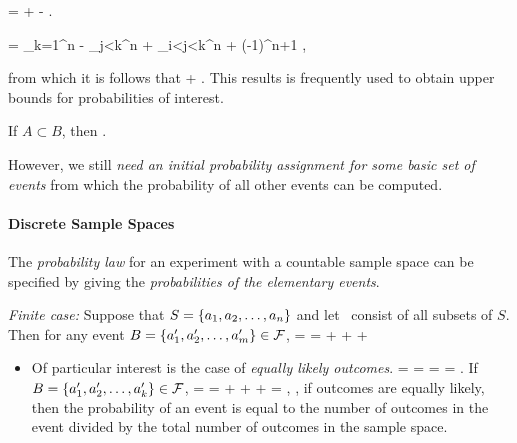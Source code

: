\begin{coro}
	\beq
		 =  +  - .
	\eeq
\end{coro}

\begin{coro}
	\beq
		= \sum_{k=1}^n 
		- \sum_{j<k}^n 
		+ \sum_{i<j<k}^n 
		\cdots
		+ (-1)^{n+1} ,
	\eeq
\end{coro}
from which it is follows that
\beq
	 \leq {} + .
\eeq
This results is frequently used to obtain
upper bounds for probabilities of interest.

\begin{coro}
If $A\subset B$, then
\beq
	 \leq {}.
\eeq
\end{coro}

However,
we still
\emph{need an initial probability assignment for some basic set of events}
from which the probability of all other events can be computed.

\paragraph{Discrete Sample Spaces}

\bit
	\item The \emph{probability law} for an experiment
	with a countable sample space
	can be specified by giving
	the \emph{probabilities of the elementary events}.

	\item \emph{Finite case:} Suppose that $S= \{a_1, a_2,\ldots,a_n\}$
	and let \evcl\ consist of all subsets of $S$.
	Then for any event $B=\{a_1', a_2', \ldots, a_m'\}\in\mathcal{F}$,
	\beq
		=
		= + + \cdots +
	\eeq

	\begin{itemize}
		\item Of particular interest is the case of \emph{equally likely outcomes}.
		\beq
			 =  = \cdots =  = .
		\eeq
		If $B=\{a_1', a_2', \ldots, a_k'\}\in\mathcal{F}$,
		\beq
			=
			=\pr{\br{a_1'}} + + \cdots +
			= ,
		\eeq
		\ie,
		if outcomes are equally likely,
		then the probability of an event is equal to the number of outcomes
		in the event divided by the total number of outcomes in the sample space.
	\end{itemize}

